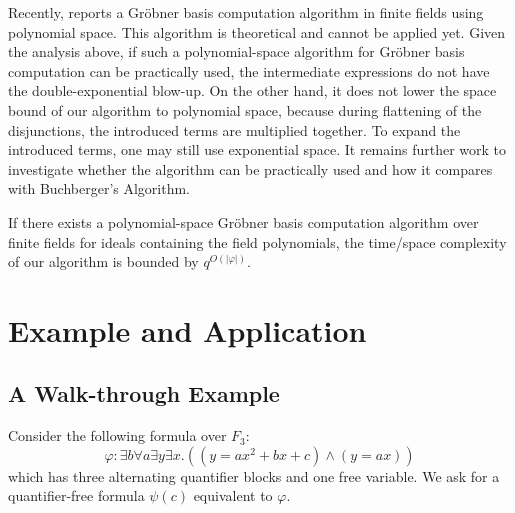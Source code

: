 \documentclass[envcountsect]{llncs}
\begin{document}
{{Recently, \cite{pspaceGB} reports a Gr\"obner basis computation algorithm in finite fields using polynomial space. This algorithm is theoretical and cannot be applied yet. Given the analysis above, if such a polynomial-space algorithm for Gr\"obner basis computation can be practically used, the intermediate expressions do not have the double-exponential blow-up. On the other hand, it does not lower the space bound of our algorithm to polynomial space, because during flattening of the disjunctions, the introduced terms are multiplied together. To expand the introduced terms, one may still use exponential space. It remains further work to investigate whether the algorithm can be practically used and how it compares with Buchberger's Algorithm.
\begin{proposition}
If there exists a polynomial-space Gr\"obner basis computation algorithm over finite fields for ideals containing the field polynomials, the time/space complexity of our algorithm is bounded by $q^{O(|\varphi|)}$.
 \label{pspace}
\end{proposition}

\section{Example and Application}

\subsection{A Walk-through Example}

Consider the following formula over $F_3$: $$\varphi: \exists b \forall a \exists y\exists x.((y=ax^2+bx+c)\wedge (y= ax))$$ which has three alternating quantifier blocks and one free variable. We ask for a quantifier-free formula $\psi(c)$ equivalent to $\varphi$. 

}}
\end{document}
